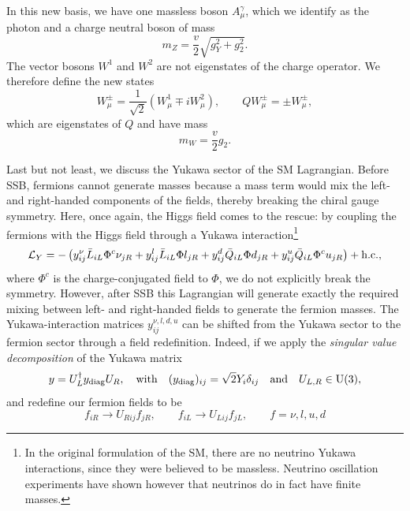 In this new basis, we have one massless boson $A^\gamma_\mu$, which we identify as the photon and a charge neutral boson of mass
\begin{equation}
m_Z = \frac{v}{2} \sqrt{g_Y^2 + g_2^2}.
\end{equation}
The vector bosons $W^1$ and $W^2$ are not eigenstates of the charge operator. We therefore define the new states
\begin{equation}
W^\pm_\mu = \frac{1}{\sqrt{2}} \left( W^1_\mu \mp i W^2_\mu \right), \qquad Q W_\mu^\pm = \pm W_\mu^\pm,
\end{equation}
which are eigenstates of $Q$ and have mass
\begin{equation}
m_W = \frac{v}{2} g_2.
\end{equation}

Last but not least, we discuss the Yukawa sector of the \acs{SM} Lagrangian. Before \acs{SSB}, fermions cannot generate masses because a mass term would mix the left- and right-handed components of the fields, thereby breaking the chiral gauge symmetry. Here, once again, the Higgs field comes to the rescue: by coupling the fermions with the Higgs field through a Yukawa interaction\footnote{In the original formulation of the \acs{SM}, there are no neutrino Yukawa interactions, since they were believed to be massless. Neutrino oscillation experiments have shown however that neutrinos do in fact have finite masses.}
\begin{equation}
\mathcal{L}_Y = - \left( y_{ij}^\nu \bar{L}_{iL} \Phi^c \nu_{jR} + y_{ij}^l \bar{L}_{iL} \Phi l_{jR} + y_{ij}^d \bar{Q}_{iL} \Phi d_{jR} + y_{ij}^u \bar{Q}_{iL} \Phi^c u_{jR} \right) + \mathrm{h.c.},
\end{equation}
where $\Phi^c$ is the charge-conjugated field to $\Phi$, we do not explicitly break the symmetry. However, after \acs{SSB} this Lagrangian will generate exactly the required mixing between left- and right-handed fields to generate the fermion masses. The Yukawa-interaction matrices $y_{ij}^{\nu,l, d, u}$ can be shifted from the Yukawa sector to the fermion sector through a field redefinition. Indeed, if we apply the \textit{singular value decomposition} of the Yukawa matrix
\begin{equation}
y = U_L^\dagger y_{\mathrm{diag}} U_R, \quad \text{with} \quad (y_{\mathrm{diag}})_{ij} = \sqrt{2} Y_i \delta_{ij} \quad \text{and} \quad U_{L,R} \in \mathrm{U}(3),
\end{equation}
and redefine our fermion fields to be
\begin{equation}
f_{iR} \longrightarrow U_{Rij} f_{jR}, \qquad f_{iL} \longrightarrow U_{Lij} f_{jL}, \qquad f = \nu, l, u, d
\end{equation}
